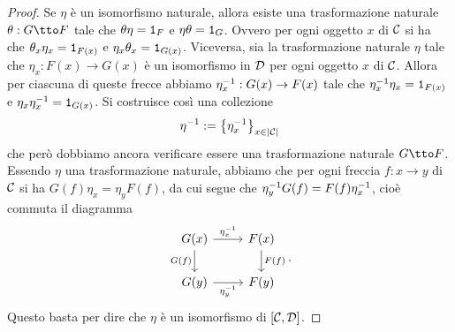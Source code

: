\begin{proof}
Se \(\eta\) è un isomorfismo naturale, allora esiste una trasformazione naturale \(\theta : G \tto F\) tale che \(\theta\eta = \mathtt{1}_F\) e \(\eta\theta = \mathtt{1}_G\). Ovvero per ogni oggetto \(x\) di \(\mathcal C\) si ha che \(\theta_x\eta_x = \mathtt{1}_{F(x)}\) e \(\eta_x\theta_x = \mathtt{1}_{G(x)}\).\newline
Viceversa, sia la trasformazione naturale \(\eta\) tale che \(\eta_x : F(x) \to G(x)\) è un isomorfismo in \(\mathcal D\) per ogni oggetto \(x\) di \(\mathcal C\). Allora per ciascuna di queste frecce abbiamo \(\eta^{-1}_x : G(x) \to F(x)\) tale che \(\eta^{-1}_x \eta_x = \mathtt{1}_{F(x)}\) e \(\eta_x \eta^{-1}_x = \mathtt{1}_{G(x)}\). Si costruisce così una collezione
\[\eta^{-1} := \left\{\eta^{-1}_x\right\}_{x \in \lvert\mathcal C\rvert}\]
che però dobbiamo ancora verificare essere una trasformazione naturale \(G \tto F\). Essendo \(\eta\) una trasformazione naturale, abbiamo che per ogni freccia \(f : x \to y\) di \(\mathcal C\) si ha \(G(f)\eta_x = \eta_yF(f)\), da cui segue che \(\eta^{-1}_y G(f) = F(f) \eta^{-1}_x\), cioè commuta il diagramma
\[\begin{tikzcd}
G(x) \ar["{\inv\eta_x}",r] \ar["G(f)",d,swap] & F(x) \ar["F(f)",d] \\
G(y) \ar["{\inv\eta_y}",r,swap] & F(y)
\end{tikzcd}.\]
Questo basta per dire che \(\eta\) è un isomorfismo di \([\mathcal C, \mathcal D]\).
\end{proof}


